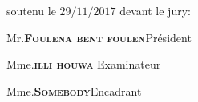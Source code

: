 \begin{titlepage}
soutenu le $29/11/2017$ devant le jury: 

\begin{center}

\vspace{0.5cm}

Mr.\textbf{\textsc{Foulena bent foulen}}\hfill Président


Mme.\textbf{\textsc{illi houwa}} \hfill Examinateur

Mme.\textbf{\textsc{Somebody}}\hfill Encadrant


\end{center}

\end{titlepage}

\restoregeometry